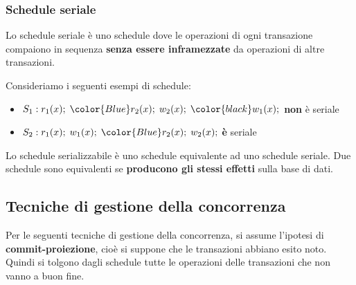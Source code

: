 \documentclass[a4paper,twoside]{article}
\begin{document}
\subsubsection{Schedule seriale}
Lo schedule seriale è uno schedule dove le operazioni di ogni
transazione compaiono in sequenza \textbf{senza essere inframezzate} da operazioni
di altre transazioni.
\begin{example}
  Consideriamo i seguenti esempi di schedule:
  \begin{itemize}
    \item \( S_1: r_1(x); \; \color{Blue}r_2(x); \; w_2(x); \; \color{black}w_1(x); \)
      \textbf{non} è seriale

    \item \( S_2: r_1(x); \; w_1(x); \; \color{Blue} r_2(x); \; w_2(x); \) 
      \textbf{è} seriale
  \end{itemize}
\end{example}

\begin{definition}
  Lo schedule serializzabile è uno schedule equivalente ad uno schedule
  seriale. Due schedule sono equivalenti se \textbf{producono gli stessi effetti}
  sulla base di dati.
\end{definition}

\subsection{Tecniche di gestione della concorrenza}
Per le seguenti tecniche di gestione della concorrenza, si assume l'ipotesi di
\textbf{commit-proiezione}, cioè si suppone che le transazioni abbiano esito noto.
Quindi si tolgono dagli schedule tutte le operazioni delle transazioni che non vanno
a buon fine.
\end{document}
